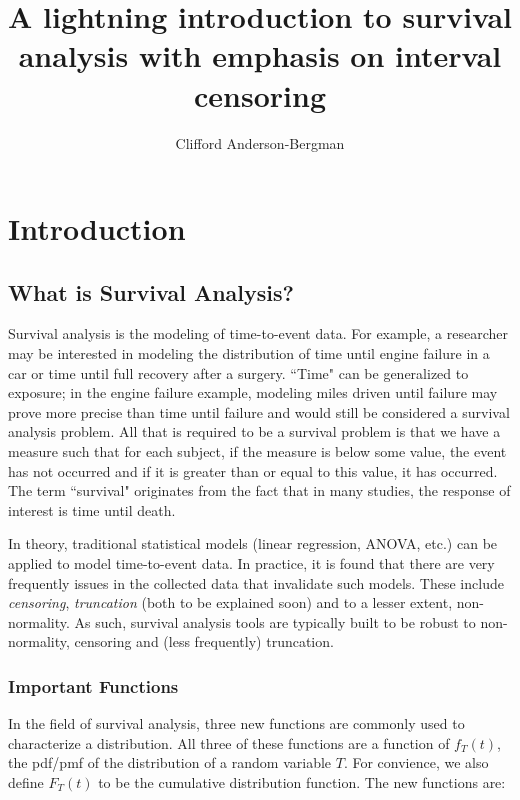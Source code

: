 \documentclass[a4paper]{article}
\begin{document}


\title{A lightning introduction to survival analysis with emphasis on interval censoring}
\author{Clifford Anderson-Bergman}
\maketitle


\tableofcontents

\section{Introduction}

\subsection{What is Survival Analysis?}

  Survival analysis is the modeling of time-to-event data. For example, a researcher may be interested in modeling the distribution of time until engine failure in a car or time until full recovery after a surgery. ``Time" can be generalized to exposure; in the engine failure example, modeling miles driven until failure may prove more precise than time until failure and would still be considered a survival analysis problem. All that is required to be a survival problem is that we have a measure such that for each subject, if the measure is below some value, the event has not occurred and if it is greater than or equal to this value, it has occurred. The term ``survival" originates from the fact that in many studies, the response of interest is time until death. 
  
  In theory, traditional statistical models (linear regression, ANOVA, etc.) can be applied to model time-to-event data. In practice, it is found that there are very frequently issues in the collected data that invalidate such models. These include \emph{censoring}, \emph{truncation} (both to be explained soon) and to a lesser extent, non-normality. As such, survival analysis tools are typically built to be robust to non-normality, censoring and (less frequently) truncation. 
  

\subsubsection{Important Functions}

  In the field of survival analysis, three new functions are commonly used to characterize a distribution. All three of these functions are a function of $f_T(t)$, the pdf/pmf of the distribution of a random variable $T$. For convience, we also define $F_T(t)$ to be the cumulative distribution function. The new functions are:
  
\end{document}
